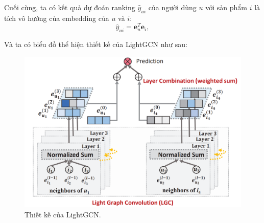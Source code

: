 \noindent Cuối cùng, ta có kết quả dự đoán ranking $\hat{y}_{ui}$ của người dùng $u$ với sản phẩm $i$ là tích vô hướng của embedding của $u$ và $i$:
\begin{equation}
    \hat{y}_{ui} = \mathbf{e}_u^T \mathbf{e}_i,
\end{equation}

\noindent Và ta có biểu đồ thể hiện thiết kế của LightGCN như sau:
\begin{figure}[H]
    \centering
    \includegraphics[scale=0.35]{images/Chapter3/lightgcn.png}
    \caption{Thiết kế của LightGCN.}
\end{figure}

